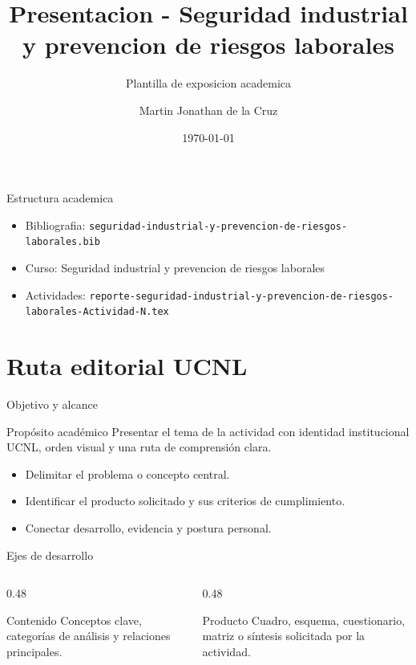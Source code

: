 ﻿\documentclass[spanish,aspectratio=169]{beamer}
\title{Presentacion - Seguridad industrial y prevencion de riesgos laborales}
\subtitle{Plantilla de exposicion academica}
\author{Martin Jonathan de la Cruz}
\institute{Universidad Ciudadana de Nuevo Leon}
\date{\today}
\begin{document}
\begin{frame}
  \titlepage
\end{frame}

\begin{frame}{Estructura academica}
  \begin{itemize}
    \item Bibliografia: \texttt{seguridad-industrial-y-prevencion-de-riesgos-laborales.bib}
    \item Curso: Seguridad industrial y prevencion de riesgos laborales
    \item Actividades: \texttt{reporte-seguridad-industrial-y-prevencion-de-riesgos-laborales-Actividad-N.tex}
  \end{itemize}
\end{frame}


\section{Ruta editorial UCNL}

\begin{frame}{Objetivo y alcance}
  \begin{block}{Propósito académico}
    Presentar el tema de la actividad con identidad institucional UCNL, orden visual y una ruta de comprensión clara.
  \end{block}
  \begin{itemize}
    \item Delimitar el problema o concepto central.
    \item Identificar el producto solicitado y sus criterios de cumplimiento.
    \item Conectar desarrollo, evidencia y postura personal.
  \end{itemize}
\end{frame}

\begin{frame}{Ejes de desarrollo}
  \begin{columns}[T,totalwidth=\textwidth]
    \begin{column}{0.48\textwidth}
      \begin{block}{Contenido}
        Conceptos clave, categorías de análisis y relaciones principales.
      \end{block}
    \end{column}
    \begin{column}{0.48\textwidth}
      \begin{block}{Producto}
        Cuadro, esquema, cuestionario, matriz o síntesis solicitada por la actividad.
      \end{block}
    \end{column}
  \end{columns}
\end{frame}
\end{document}
